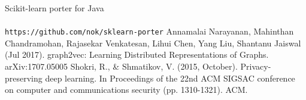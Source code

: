 \documentclass[12pt,a4paper,twoside]{article}
\begin{document}
\begin{thebibliography}{9}
 Scikit-learn porter for Java \\
\\\texttt{https://github.com/nok/sklearn-porter}
Annamalai Narayanan, Mahinthan Chandramohan, Rajasekar Venkatesan, Lihui Chen, Yang Liu, Shantanu Jaiswal (Jul 2017).
graph2vec: Learning Distributed Representations of Graphs. arXiv:1707.05005
Shokri, R., \& Shmatikov, V. (2015, October). Privacy-preserving deep learning. In Proceedings of the 22nd ACM SIGSAC conference on computer and communications security (pp. 1310-1321). ACM.

\end{thebibliography}
\end{document}
